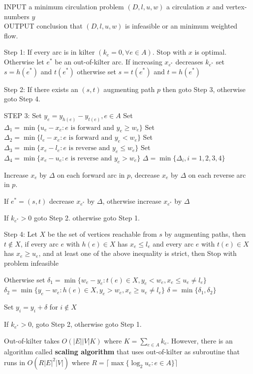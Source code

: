 				INPUT a minimum circulation problem $(D, l, u, w)$ a circulation $x$ and vertex-numbers $y$\\
				OUTPUT conclusion that $(D, l, u, w)$ is infeasible or an minimum weighted flow.

				Step 1: If every arc is in kilter $(k_e = 0, \forall e\in A)$. Stop with $x$ is optimal. Otherwise let $e^*$ be an out-of-kilter arc. If increasing $x_{e^*}$ decreases $k_{e^*}$ set $s=h(e^*)$ and $t(e^*)$ otherwise set $s=t(e^*)$ and $t=h(e^*)$

				Step 2: If there exists an $(s, t)$ augmenting path $p$ then goto Step 3, otherwise goto Step 4.

				STEP 3: Set $y_e = y_{h(e)} - y_{t(e)}, e\in A$
				Set $\Delta_1 = \min\{u_e - x_e: e \text{ is forward and } y_e \ge w_e\}$
				Set $\Delta_2 = \min\{l_e - x_e: e \text{ is forward and } y_e < w_e\}$
				Set $\Delta_3 = \min\{x_e - l_e: e \text{ is reverse and } y_e \le w_e\}$
				Set $\Delta_4 = \min\{x_e - u_e: e \text{ is reverse and } y_e > w_e\}$
				$\Delta = \min\{\Delta_i, i = 1, 2, 3, 4\}$

				Increase $x_e$ by $\Delta$ on each forward arc in $p$, decrease $x_e$ by $\Delta$ on each reverse arc in $p$.

				If $e^* = (s, t)$ decrease $x_{e^*}$ by $\Delta$, otherwise increase $x_{e^*}$ by $\Delta$

				If $k_{e^*} > 0$ goto Step 2. otherwise goto Step 1.

				Step 4: Let $X$ be the set of vertices reachable from $s$ by augmenting paths, then $t \notin X$, if every arc $e$ with $h(e) \in X$ has $x_e \le l_e$ and every arc $e$ with $t(e) \in X$ has $x_e \ge u_e$, and at least one of the above inequality is strict, then Stop with problem infeasible

				Otherwise set
				$\delta_1 = \min\{w_e - y_e: t(e) \in X, y_e < w_e, x_e \le u_e \neq l_e\}$
				$\delta_2 = \min\{y_e - w_e: h(e) \in X, y_e > w_e, x_e \ge u_e \neq l_e\}$
				$\delta = \min\{\delta_1, \delta_2\}$

				Set $y_i = y_i + \delta$ for $i \notin X$

				If $k_{e^*} > 0$, goto Step 2, otherwise goto Step 1.

				Out-of-kilter takes $O(|E||V|K)$ where $K = \sum_{e\in A} k_e$. However, there is an algorithm called \textbf{scaling algorithm} that uses out-of-kilter as subroutine that runs in $O(R|E|^2|V|)$ where $R = \lceil \max\{\log_2 u_e: e\in A\}\rceil$

